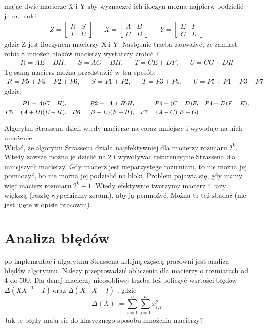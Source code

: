 \documentclass[paper=a4, fontsize=11pt]{scrartcl} %
\numberwithin{equation}{section} %
\numberwithin{figure}{section} %
\numberwithin{table}{section} %
\begin{document}
mając dwie macierze X i Y aby wyznaczyć ich iloczyn można najpierw podzielić je na bloki
\begin{align}
Z = 
\begin{bmatrix}
R & S \\
T & U
\end{bmatrix} &&
X = 
\begin{bmatrix}
A & B \\
C & D
\end{bmatrix} &&
Y = 
\begin{bmatrix}
E & F \\
G & H
\end{bmatrix}
\end{align}
gdzie Z jest iloczynem macierzy X i Y. Następnie trzeba zauważyć, że zamiast robić 8 mnożeń bloków macierzy wystarczy zrobić 7.\\
\begin{align}
R = AE + BH, && S = AG + BH, && T = CE + DF, && U = CG + DH
\end{align}
Tę samą macierz można przedstawić w ten sposób:\\
\begin{align}
R = P5 + P4 - P2 + P6, && S = P1 + P2, && T = P3 + P4, && U = P5 + P1 - P3 - P7
\end{align}
gdzie:\\
\begin{align}
P1 = A(G - H), && P2 = (A + B)H, && P3 = (C + D)E, && P4 = D(F - E), \notag\\
P5 = (A + D)(E + H), && P6 = (B - D)(F + H), && P7 = (A - C)(E + G)
\end{align}

Algorytm Strassena dzieli wtedy macierze na coraz mniejsze i wywołuje na nich mnożenie. \\

Widać, że algorytm Strassena działa najefektywniej dla macierzy rozmiaru 
${2^k}$. Wtedy zawsze można je dzielić na 2 i wywoływać rekurencyjnie Strassena dla mniejszych macierzy. Gdy macierz jest nieparzystego rozumiaru, to nie można jej pomnożyć, bo nie można jej podzielić na bloki. Problem pojawia się, gdy mamy więc macierz rozmiaru 
${2^k+1}$. Wtedy efektywnie tworzymy macierz 4 razy większą (resztę wypełniamy zerami), aby ją pomnożyć. Można to też zbadać (nie jest ujęte w opisie pracowni).


\section{Analiza błędów}
po implementacji algorytmu Strassena kolejną częścią pracowni jest analiza błędów algorytmu.
Należy przeprowadzić obliczenia dla macierzy o rozmiarach od 4 do 500. Dla danej macierzy nieosobliwej trzeba też policzyć wartości błędów 
$\Delta(X X^{-1} - I)$ oraz $\Delta(X^{-1}X - I)$ , gdzie 
$${\Delta(X) := \sum_{i=1}^n \sum_{j=1}^n x_{i,j}^2 }$$ 
Jak te błędy mają się do klasycznego sposobu mnożenia macierzy?\\
\end{document}
